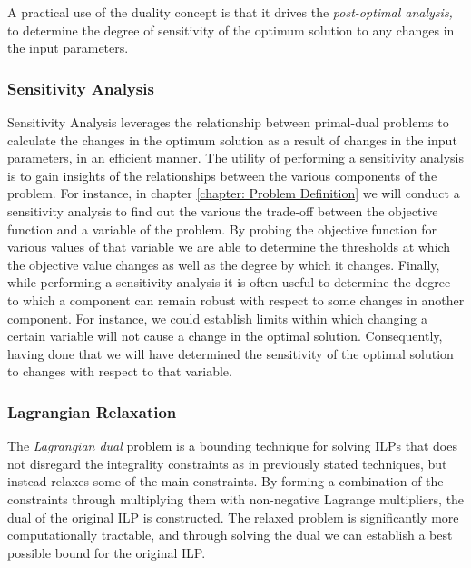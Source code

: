 \vspace{\baselineskip}
\noindent
A practical use of the duality concept is that it drives the \textit{post-optimal analysis, }to determine the degree of sensitivity of the optimum solution to any changes in the input parameters. \par

\subsubsection*{Sensitivity Analysis}

Sensitivity Analysis leverages the relationship between primal-dual problems to calculate the changes in the optimum solution as a result of changes in the input parameters, in an efficient manner. The utility of performing a sensitivity analysis is to gain insights of the relationships between the various components of the problem. For instance, in chapter \ref{chapter: Problem Definition} we will conduct a sensitivity analysis to find out the various the trade-off between the objective function and a variable of the problem. By probing the objective function for various values of that variable we are able to determine the thresholds at which the objective value changes as well as the degree by which it changes. Finally, while performing a sensitivity analysis it is often useful to determine the degree to which a component can remain robust with respect to some changes in another component. For instance, we could establish limits within which changing a certain variable will not cause a change in the optimal solution. Consequently, having done that we will have determined the sensitivity of the optimal solution to changes with respect to that variable.\par


\subsubsection*{Lagrangian Relaxation}
The \textit{Lagrangian dual} problem is a bounding technique for solving ILPs that does not disregard the integrality constraints as in previously stated techniques, but instead relaxes some of the main constraints. By forming a combination of the constraints through multiplying them with non-negative Lagrange multipliers, the dual of the original ILP is constructed. The relaxed problem is significantly more computationally tractable, and through solving the dual we can establish a best possible bound for the original ILP.\par

